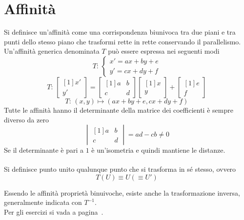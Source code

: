 
\section{Affinità}\label{sec:aff}
Si definisce un'affinità come una corrispondenza biunivoca tra due piani e tra punti dello stesso 
piano che trasformi rette in rette conservando il parallelismo.\\
Un'affinità generica denominata $T$ può essere espressa nei seguenti modi
\begin{equation*}
T:\,\begin{cases}
x'=ax+by+e\\
y'=cx+dy+f
\end{cases}
\end{equation*}
\begin{equation*}
T:\,\begin{bmatrix}[1]
x'\\y'
\end{bmatrix}=
\begin{bmatrix}[1]
a&b\\
c&d
\end{bmatrix}
\begin{bmatrix}[1]
x\\y
\end{bmatrix}
+\begin{bmatrix}[1]
e\\f
\end{bmatrix}
\end{equation*}
\begin{equation*}
T:\,(x,y)\mapsto(ax+by+e,cx+dy+f)
\end{equation*}
Tutte le affinità hanno il determinante della matrice dei coefficienti è sempre diverso da zero
\begin{equation*}
\begin{vmatrix}[1]
a&b\\
c&d
\end{vmatrix} = ad-cb \neq0
\end{equation*}
Se il determinante è pari a $1$ è un'isometria e quindi mantiene le distanze.\\\\

Si definisce punto unito qualunque punto che si trasforma in sé stesso, ovvero
\begin{equation*}
T(U) \equiv U (\equiv U')
\end{equation*}

Essendo le affinità proprietà binuivoche, esiste anche la trasformazione inversa, generalmente 
indicata con $T^{-1}$.\\
Per gli esercizi si vada a pagina~\pageref{ex:aff}.

